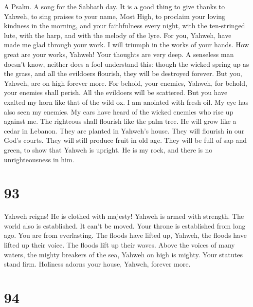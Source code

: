 A Psalm. A song for the Sabbath day.  It is a good thing to
give thanks to Yahweh, to sing praises to your name, Most High,
 to proclaim your loving kindness in the morning, and your
faithfulness every night,  with the ten-stringed lute, with
the harp, and with the melody of the lyre.  For you, Yahweh,
have made me glad through your work. I will triumph in the works of your
hands.  How great are your works, Yahweh! Your thoughts are
very deep.  A senseless man doesn't know, neither does a
fool understand this:  though the wicked spring up as the
grass, and all the evildoers flourish, they will be destroyed forever.
 But you, Yahweh, are on high forever more.  For
behold, your enemies, Yahweh, for behold, your enemies shall perish. All
the evildoers will be scattered.  But you have exalted my
horn like that of the wild ox. I am anointed with fresh oil.
 My eye has also seen my enemies. My ears have heard of the
wicked enemies who rise up against me.  The righteous shall
flourish like the palm tree. He will grow like a cedar in Lebanon.
 They are planted in Yahweh's house. They will flourish in
our God's courts.  They will still produce fruit in old
age. They will be full of sap and green,  to show that
Yahweh is upright. He is my rock, and there is no unrighteousness in
him.

\hypertarget{section-83}{%
\section{93}\label{section-83}}

 Yahweh reigns! He is clothed with majesty! Yahweh is armed
with strength. The world also is established. It can't be moved.
 Your throne is established from long ago. You are from
everlasting.  The floods have lifted up, Yahweh, the floods
have lifted up their voice. The floods lift up their waves. 
Above the voices of many waters, the mighty breakers of the sea, Yahweh
on high is mighty.  Your statutes stand firm. Holiness
adorns your house, Yahweh, forever more.

\hypertarget{section-84}{%
\section{94}\label{section-84}}

